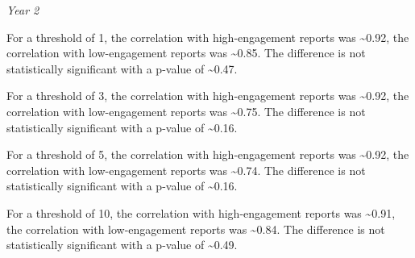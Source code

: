 \documentclass[
]{article}
\newenvironment{Shaded}{\begin{snugshade}}{\end{snugshade}}
\newcommand{\AttributeTok}[1]{\textcolor[rgb]{0.77,0.63,0.00}{#1}}
\newcommand{\FunctionTok}[1]{\textcolor[rgb]{0.00,0.00,0.00}{#1}}
\newcommand{\NormalTok}[1]{#1}
\newcommand{\OtherTok}[1]{\textcolor[rgb]{0.56,0.35,0.01}{#1}}
\newcommand{\SpecialCharTok}[1]{\textcolor[rgb]{0.00,0.00,0.00}{#1}}
\newcommand{\StringTok}[1]{\textcolor[rgb]{0.31,0.60,0.02}{#1}}
\begin{document}
\begin{Shaded}
\end{Shaded}

\emph{Year 2}

For a threshold of 1, the correlation with high-engagement reports was
\textasciitilde0.92, the correlation with low-engagement reports was
\textasciitilde0.85. The difference is not statistically significant
with a p-value of \textasciitilde0.47.

For a threshold of 3, the correlation with high-engagement reports was
\textasciitilde0.92, the correlation with low-engagement reports was
\textasciitilde0.75. The difference is not statistically significant
with a p-value of \textasciitilde0.16.

For a threshold of 5, the correlation with high-engagement reports was
\textasciitilde0.92, the correlation with low-engagement reports was
\textasciitilde0.74. The difference is not statistically significant
with a p-value of \textasciitilde0.16.

For a threshold of 10, the correlation with high-engagement reports was
\textasciitilde0.91, the correlation with low-engagement reports was
\textasciitilde0.84. The difference is not statistically significant
with a p-value of \textasciitilde0.49.
\end{document}

